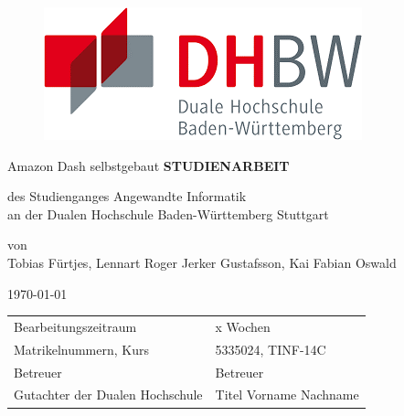 \begin{figure}[!htb]
%
  \includegraphics[width=\linewidth]{DHBW-Logo.png}
  \label{fig:awesome_image3}
\endminipage
\end{figure}

\begin{center}
\vfill
{\Large Amazon Dash selbstgebaut}
\vfill
\textbf{STUDIENARBEIT}
\vfill

des Studienganges Angewandte Informatik\\
\vspace{12pt}
an der Dualen Hochschule Baden-Württemberg Stuttgart
\vfill

von\\
\vspace{12pt}
Tobias Fürtjes, Lennart Roger Jerker Gustafsson, Kai Fabian Oswald
\vfill

\today
\vfill

\begin{tabular}{ll}
Bearbeitungszeitraum & x Wochen \\
Matrikelnummern, Kurs & 5335024, TINF-14C \\
Betreuer & Betreuer \\
Gutachter der Dualen Hochschule	& Titel Vorname Nachname \\
\end{tabular}

\end{center}